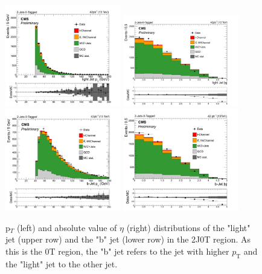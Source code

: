 \begin{figure}[hbpt]
\begin{center}
\includegraphics[width=0.45\textwidth,height=0.4\textwidth]{figures/2J0T/Sep8/lightJetPt.png}
\includegraphics[width=0.45\textwidth,height=0.4\textwidth]{figures/2J0T/Sep8/lightJetEta.png}
\includegraphics[width=0.45\textwidth,height=0.4\textwidth]{figures/2J0T/Sep8/bJetPt.png}
\includegraphics[width=0.45\textwidth,height=0.4\textwidth]{figures/2J0T/Sep8/bJetEta.png}\hfill
\caption{\label{fig:Jets2J0T}p$_{T}$ (left) and absolute value of $\eta$ (right) distributions of the "light" jet (upper row) and the "b" jet (lower row) in the 2J0T region. As this is the 0T region, the "b" jet refers to the jet with higher $p_{\mathrm{T}}$ and the "light" jet to the other jet.}
\end{center}
\end{figure}


